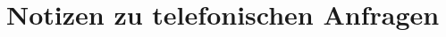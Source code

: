 \documentclass[
  twoside,
  parskip=half-,
  paper=176mm:246mm,
  BCOR=14mm,
  DIV=14,
]{scrreprt}
\makeatletter
\renewenvironment*{displayquote}
  {\begingroup\setlength{\leftmargini}{0pt}\csq@getcargs{\csq@bdquote{}{}}}
  {\csq@edquote\endgroup}
\makeatother
\begin{document}



% 

\chapter{Notizen zu telefonischen Anfragen}
\end{document}
